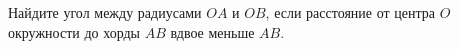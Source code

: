 \begin{ex}
	\begin{condition}
		Найдите угол между радиусами \( OA  \) и \( OB \), если расстояние от центра \( O  \) окружности до хорды \( AB \) вдвое меньше \( AB \).
	\end{condition}
	\answer{\( 90\degree \)}
\end{ex}